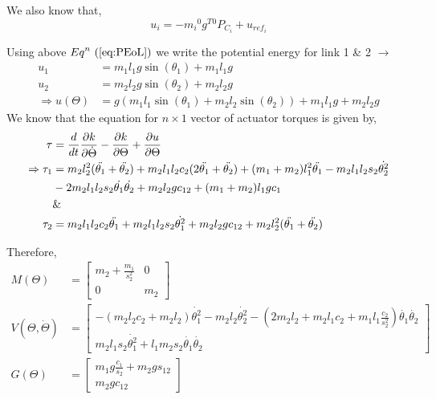 \documentclass[a4paper]{article}
\begin{document}
\begin{qalist}
			We also know that, 
			\begin{equation}\label{eq:PEoL}
				{u}_{i} = -{m}_{i} {}^{0}{g}^{T} {}^{0}{P}_{{C}_{i}} + {u}_{{ref}_{i}}
			\end{equation}
			
			Using above  ${Eq}^{n}~(\ref{eq:PEoL})$ we write the potential energy for link 1 \& 2 $\rightarrow$
			\begin{align}
				\label{eq:PEoL1} {u}_{1} &= {m}_{1} {l}_{1} g \sin({\theta}_{1}) + {m}_{1} {l}_{1} g \\
				\label{eq:PEoL2} {u}_{2} &= {m}_{2} {l}_{2} g\sin({\theta}_{2}) + {m}_{2} {l}_{2}g \\
				\label{eq:PETot} \Rightarrow  u(\Theta) &= g ({m}_{1} {l}_{1}\sin({\theta}_{1}) + {m}_{2} {l}_{2}\sin({\theta}_{2}) )  + {m}_{1} {l}_{1} g + {m}_{2} {l}_{2}g
			\end{align}
			We know that the equation for $n \times 1$ vector of actuator torques is given by, 
			\begin{align}
				\label{eq:ActTorq} \tau &=  \frac{d}{dt} \frac{\partial k}{\partial \dot{\Theta}} - \frac{\partial k}{\partial \Theta} + \frac{\partial u}{\partial \Theta} \\
				\Rightarrow {\tau}_{1} &= {m}_{2} {l}^{2}_{2} (\ddot{{\theta}_{1}} + \ddot{{\theta}_{2}}) + {m}_{2}{l}_{1}{l}_{2}{c}_{2}(2\ddot{{\theta}_{1}} + \ddot{{\theta}_{2}}) + ({m}_{1} + {m}_{2}){l}^{2}_{1} \ddot{{\theta}_{1}} - {m}_{2} {l}_{1} {l}_{2} {s}_{2} \dot{{\theta}^{2}_{2}} \notag \\
				&-2{m}_{2}{l}_{1}{l}_{2}{s}_{2}\dot{{\theta}_{1}}\dot{{\theta}_{2}} + {m}_{2}{l}_{2}g{c}_{12} + ({m}_{1} + {m}_{2}){l}_{1}g{c}_{1} \\ &\& \notag\\
				 {\tau}_{2} &= {m}_{2}{l}_{1}{l}_{2}{c}_{2}\ddot{{\theta}_{1}} + {m}_{2}{l}_{1}{l}_{2}{s}_{2}\dot{{\theta}^{2}_{1}} +{m}_{2}{l}_{2}g{c}_{12} + {m}_{2}{l}^{2}_{2}(\ddot{{\theta}_{1}} + \ddot{{\theta}_{2}})
			\end{align}
			
			Therefore, 
			\begin{align}
				M(\Theta) &= \begin{bmatrix} {m}_{2} + \frac{{m}_{1}}{{s}^{2}_{2}} & 0 \\ 0 & {m}_{2}\end{bmatrix} \\
				V(\Theta, \dot{\Theta}) &= \begin{bmatrix} -({m}_{2} {l}_{2} {c}_{2} + {m}_{2}{l}_{2}) \dot{{\theta}^{2}_{1}} - {m}_{2}{l}_{2}\dot{{\theta}^{2}_{2}} -(2{m}_{2}{l}_{2} + {m}_{2}{l}_{1}{c}_{2} + {m}_{1}{l}_{1}\frac{{c}_{2}}{{s}^{2}_{2}})\dot{{\theta}_{1}}\dot{{\theta}_{2}} \\  {m}_{2}{l}_{1}{s}_{2}\dot{{\theta}^{2}_{1}} + {l}_{1}{m}_{2}{s}_{2}\dot{{\theta}_{1}} \dot{{\theta}_{2}} \end{bmatrix} \\
				G(\Theta) &= \begin{bmatrix} {m}_{1}g\frac{{c}_{1}}{{s}_{2}} + {m}_{2}g{s}_{12} \\ {m}_{2}g{c}_{12} \end{bmatrix}
			\end{align}
			
	\end{qalist}
\end{document}
